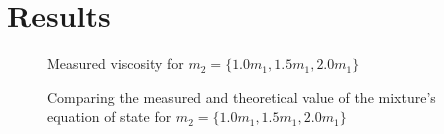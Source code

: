 \chapter{Results}

\begin{figure}[htbp]
    \begin{center}
        
        \caption{
            Measured viscosity for $m_2 = 
            \{1.0m_1, 1.5m_1, 2.0m_1\}$
        }
    \end{center}
\end{figure}

\begin{figure}[htbp]
    \begin{center}
        
    \end{center}
        \caption{
            Comparing the measured and theoretical value of the mixture's
            equation of state for $m_2 = \{1.0m_1, 1.5m_1, 2.0m_1\}$
        }
\end{figure}
